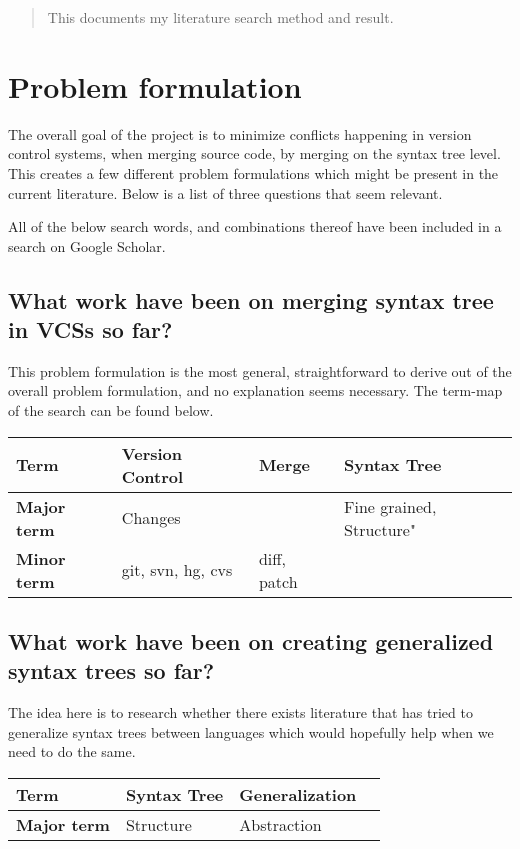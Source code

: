 \documentclass[12pt]{article}
\begin{document}
\maketitle

\begin{abstract}
This documents my literature search method and result.
\end{abstract}

\section{Problem formulation}
The overall goal of the project is to minimize conflicts happening in version control systems, when merging source code, by merging on the syntax tree level. This creates a few different problem formulations which might be present in the current literature. Below is a list of three questions that seem relevant.

All of the below search words, and combinations thereof have been included in a search on Google Scholar.

\subsection{What work have been on merging syntax tree in VCSs so far?}
This problem formulation is the most general, straightforward to derive out of the overall problem formulation, and no explanation seems necessary. The term-map of the search can be found below.

\begin{tabular}{ | l | l | l | l |}
    \hline
    \textbf{Term} & Version Control & Merge & Syntax Tree \\ \hline
    \textbf{Major term} & Changes & & Fine grained, Structure" \\ \hline
    \textbf{Minor term} & git, svn, hg, cvs  & diff, patch & \\ \hline
\end{tabular}

\subsection{What work have been on creating generalized syntax trees so far?}
The idea here is to research whether there exists literature that has tried to generalize syntax trees between languages which would hopefully help when we need to do the same.

\begin{tabular}{ | l | l | l | l | }
    \hline
    \textbf{Term} & Syntax Tree & Generalization \\ \hline
    \textbf{Major term} & Structure & Abstraction \\ \hline
\end{tabular}
\end{document}
